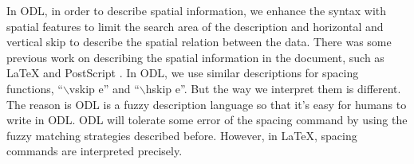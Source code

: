 In ODL, in order to describe spatial information, 
we enhance the syntax with spatial features to limit the 
search area of the description and horizontal and vertical 
skip to describe the spatial relation between the data. There was some 
previous work on describing the spatial information in the document, 
such as LaTeX \cite{lamport1986document} and 
PostScript \cite{taft1999post}.  In ODL, 
we use similar descriptions for spacing functions, ``$\backslash$vskip e'' 
and ``$\backslash$hskip e''. But the way we interpret them is different. 
The reason is ODL is a fuzzy description language so that it's easy for 
humans to write in ODL. ODL will tolerate some error of the spacing 
command by using the fuzzy matching strategies described before. 
However, in LaTeX, spacing commands are interpreted precisely. 


